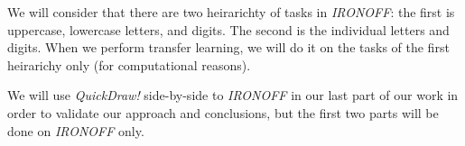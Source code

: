  \par We will consider that there are two heirarichty of tasks in \textit{IRONOFF}: the first is uppercase, lowercase letters, and digits. The second is the individual letters and digits. When we perform transfer learning, we will do it on the tasks of the first heirarichy only (for computational reasons).

  \par We will use \textit{QuickDraw!} side-by-side to \textit{IRONOFF} in our last part of our work in order to validate our approach and conclusions, but the first two parts will be done on \textit{IRONOFF} only.

